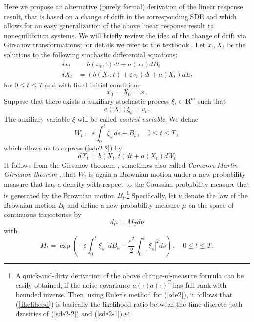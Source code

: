 \documentclass[]{tMPH2e}
\newcommand{\R}{{\mathbf R}}
\newcommand{\eps}{\varepsilon}
\newcommand{\wrt}{with respect to }
\begin{document}
Here we propose an alternative (purely formal) derivation of the linear response result, that is based on a change of drift in the corresponding SDE and which allows for an easy generalization of the above linear response result to nonequilibrium systems. We will briefly review the idea of the change of drift via Girsanov transformations; for details we refer to the textbook \cite{oksendal2003stochastic}. Let $x_{t},X_{t}$ be the solutions to the following stochastic differential equations:
\begin{subequations}\label{sde2}
\begin{align}
dx_{t} & = b(x_{t},t)dt + a(x_{t})dB_{t} \label{sde2-1}\\
dX_{t} & = (b(X_{t},t) + \eps v_{t})dt +a(X_{t})dB_{t} \label{sde2-2}
\end{align}
\end{subequations}
for $0\le t\le T$ and with fixed initial conditions
\[
x_{0} = X_{0} = x\,.
\]
Suppose that there exists a auxiliary stochastic process $\xi_{t}\in\R^{m}$ such that 
\begin{equation}\label{xi}
a(X_{t})\xi_{t} = v_{t}\,.
\end{equation}
The auxiliary variable $\xi$ will be called \emph{control variable}. We define  
\[
W_{t} = \eps\int_{0}^{t}\xi_{s}\,ds + B_{t}\,,\quad 0\le t\le T\,,
\]
which allows us to express (\ref{sde2-2}) by
\begin{equation}\label{sde2-3}
dX_{t} = b(X_{t},t)dt +a(X_{t})dW_{t} 
\end{equation}
It follows from the Girsanov theorem \cite[Thm.~8.6.8]{oksendal2003stochastic}, sometimes also called \emph{Cameron-Martin-Girsanov theorem} \cite{stroock2006}, that $W_{t}$ is again a Brownian motion under a new probability measure that has a density \wrt the Gaussian probability measure that is generated by the Brownian motion $B_{t}$.\footnote{A quick-and-dirty derivation of the above change-of-measure formula can be easily obtained, if the noise covariance $a(\cdot)a(\cdot)^{T}$ has full rank with bounded inverse. Then, using Euler's method for (\ref{sde2}), it follows that (\ref{likelihood}) is basically the likelihood ratio between the time-discrete path densities of (\ref{sde2-2}) and (\ref{sde2-1}).   } Specifically, let $\nu$ denote the law of the Brownian motion $B_{t}$ and define a new probability measure $\mu$ on the space of continuous trajectories by 
\[
d\mu=M_{T}d\nu
\]
with 
\begin{equation}\label{likelihood}
M_{t} = \exp\left(-\eps\int_{0}^{t}\xi_{s}\cdot dB_{s} - \frac{\eps^{2}}{2}\int_{0}^{t}|\xi_{s}|^{2}ds\right)\,,\quad 0\le t\le T\,.
\end{equation}
\end{document}
